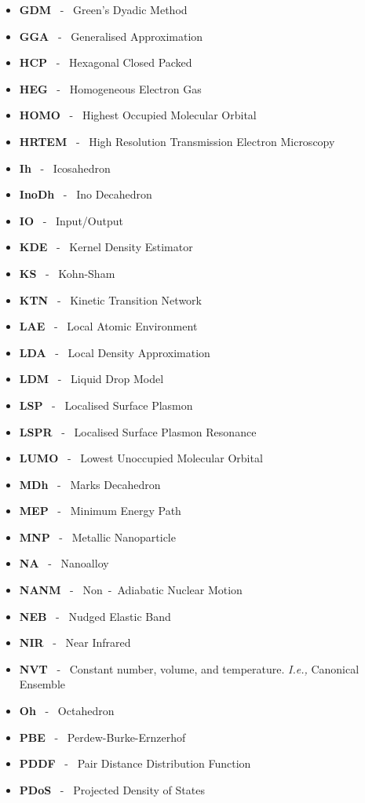 \begin{itemize}
\item[]\textbf{GDM} ~-~ Green's Dyadic Method
\item[]\textbf{GGA} ~-~ Generalised Approximation
\item[]\textbf{HCP} ~-~ Hexagonal Closed Packed
\item[]\textbf{HEG} ~-~ Homogeneous Electron Gas
\item[]\textbf{HOMO} ~-~ Highest Occupied Molecular Orbital
\item[]\textbf{HRTEM} ~-~ High Resolution Transmission Electron Microscopy
\item[]\textbf{Ih} ~-~ Icosahedron
\item[]\textbf{InoDh} ~-~ Ino Decahedron
\item[]\textbf{IO} ~-~ Input/Output
\item[]\textbf{KDE} ~-~ Kernel Density Estimator
\item[]\textbf{KS} ~-~ Kohn-Sham
\item[]\textbf{KTN} ~-~ Kinetic Transition Network
\item[]\textbf{LAE} ~-~ Local Atomic Environment
\item[]\textbf{LDA} ~-~ Local Density Approximation
\item[]\textbf{LDM} ~-~ Liquid Drop Model
\item[]\textbf{LSP} ~-~ Localised Surface Plasmon
\item[]\textbf{LSPR} ~-~ Localised Surface Plasmon Resonance
\item[]\textbf{LUMO} ~-~ Lowest Unoccupied Molecular Orbital
\item[]\textbf{MDh} ~-~ Marks Decahedron
\item[]\textbf{MEP} ~-~ Minimum Energy Path
\item[]\textbf{MNP} ~-~ Metallic Nanoparticle
\item[]\textbf{NA} ~-~ Nanoalloy
\item[]\textbf{NANM} ~-~ Non~-~Adiabatic Nuclear Motion
\item[]\textbf{NEB} ~-~ Nudged Elastic Band
\item[] \textbf{NIR} ~-~ Near Infrared
\item[]\textbf{NVT} ~-~ Constant number, volume, and temperature. \textit{I.e.,} Canonical Ensemble
\item[]\textbf{Oh} ~-~ Octahedron
\item[]\textbf{PBE} ~-~ Perdew-Burke-Ernzerhof
\item[]\textbf{PDDF} ~-~ Pair Distance Distribution Function
\item[]\textbf{PDoS} ~-~ Projected Density of States

\end{itemize}
